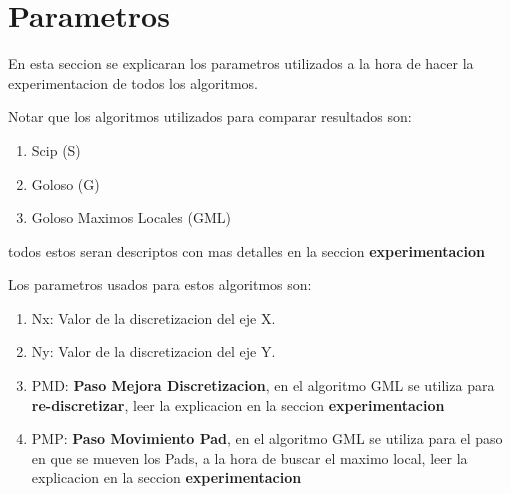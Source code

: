 \newpage
\section{Parametros}

En esta seccion se explicaran los parametros utilizados a la hora de hacer la experimentacion de todos los algoritmos. 

Notar que los algoritmos utilizados para comparar resultados son:

\begin{enumerate}
\item Scip (S)
\item Goloso (G)
\item Goloso Maximos Locales (GML)
\end{enumerate}

todos estos seran descriptos con mas detalles en la seccion \textbf{experimentacion}

Los parametros usados para estos algoritmos son:


\begin{enumerate}
\item Nx: Valor de la discretizacion del eje X.
\item Ny: Valor de la discretizacion del eje Y.
\item PMD: \textbf{Paso Mejora Discretizacion}, en el algoritmo GML se utiliza para \textbf{re-discretizar}, leer la explicacion en la seccion \textbf{experimentacion}
\item PMP: \textbf{Paso Movimiento Pad}, en el algoritmo GML se utiliza para el paso en que se mueven los Pads, a la hora de buscar el maximo local, leer la explicacion en la seccion \textbf{experimentacion}
\end{enumerate}


